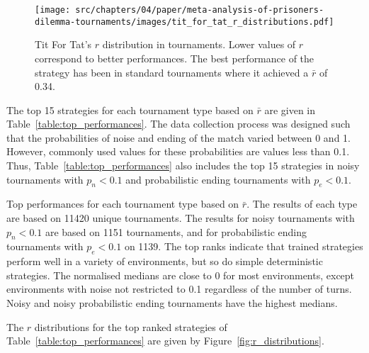 \begin{figure}[!htbp]
    \centering
    \texttt{[image: src/chapters/04/paper/meta-analysis-of-prisoners-dilemma-tournaments/images/tit\_for\_tat\_r\_distributions.pdf]}
    \caption{Tit For Tat's $r$ distribution in tournaments. Lower values of \(r\)
    correspond to better performances. The best performance
    of the strategy has been in standard tournaments where it achieved a $\bar{r}$
    of 0.34.}
    \label{fig:tit_for_tat_r_distribution}
\end{figure}

The top 15 strategies for each tournament type based on \(\bar{r}\) are given in
Table~\ref{table:top_performances}. The data collection process was designed such
that the probabilities of noise and ending of the match varied between 0 and
1. However, commonly used values for these probabilities are values less than 0.1.
Thus,
Table~\ref{table:top_performances} also includes the top 15 strategies in noisy
tournaments with \(p_n < 0.1\) and probabilistic ending tournaments with \(p_e <
0.1\).

\begin{table}[!htbp]
    \begin{center}
    \resizebox{\textwidth}{!}{
        
    }
\end{center}
\caption{Top performances for each tournament type based on $\bar{r}$. The
results of each type are based on 11420 unique tournaments. The
results for noisy tournaments with \(p_n < 0.1\) are based on 1151 tournaments,
and for probabilistic ending tournaments with \(p_e < 0.1\) on 1139. The top
ranks indicate that trained strategies perform well in a variety of
environments, but so do simple deterministic strategies. The normalised medians
are close to 0 for most environments, except environments with noise not
restricted to 0.1 regardless of the number of turns. Noisy and noisy probabilistic
ending tournaments have the highest medians.}
\label{table:top_performances}
\end{table}

The \(r\) distributions for the top ranked strategies of Table~\ref{table:top_performances}
are given by Figure~\ref{fig:r_distributions}.

